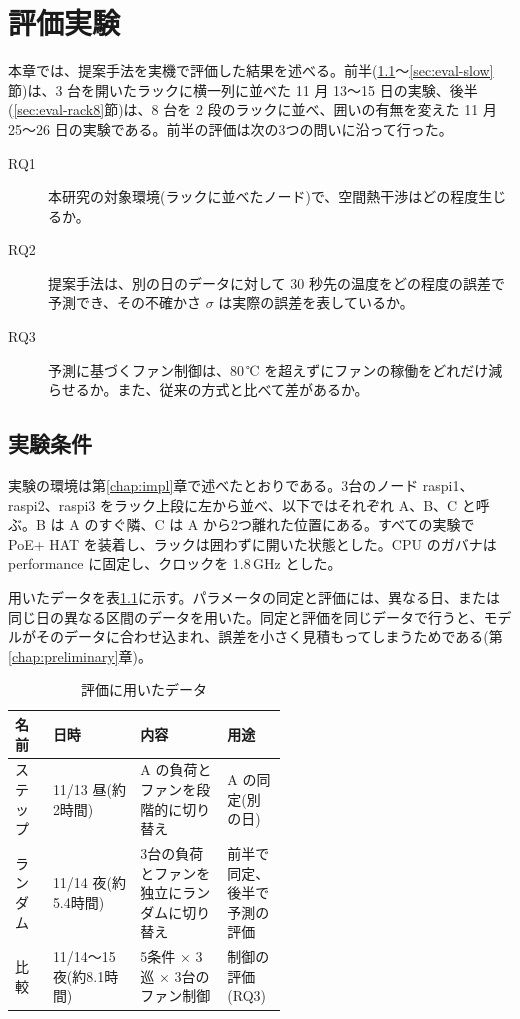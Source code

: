 \chapter{評価実験}\label{chap:eval}

本章では、提案手法を実機で評価した結果を述べる。前半(\ref{sec:eval-cond}〜\ref{sec:eval-slow}節)は、3 台を開いたラックに横一列に並べた 11 月 13〜15 日の実験、後半(\ref{sec:eval-rack8}節)は、8 台を 2 段のラックに並べ、囲いの有無を変えた 11 月 25〜26 日の実験である。前半の評価は次の3つの問いに沿って行った。

\begin{description}
  \item[RQ1] 本研究の対象環境(ラックに並べたノード)で、空間熱干渉はどの程度生じるか。
  \item[RQ2] 提案手法は、別の日のデータに対して 30 秒先の温度をどの程度の誤差で予測でき、その不確かさ $\sigma$ は実際の誤差を表しているか。
  \item[RQ3] 予測に基づくファン制御は、80\,℃ を超えずにファンの稼働をどれだけ減らせるか。また、従来の方式と比べて差があるか。
\end{description}

\section{実験条件}\label{sec:eval-cond}
実験の環境は第\ref{chap:impl}章で述べたとおりである。3台のノード raspi1、raspi2、raspi3 をラック上段に左から並べ、以下ではそれぞれ A、B、C と呼ぶ。B は A のすぐ隣、C は A から2つ離れた位置にある。すべての実験で PoE+ HAT を装着し、ラックは囲わずに開いた状態とした。CPU のガバナは performance に固定し、クロックを 1.8\,GHz とした。

用いたデータを表\ref{tab:eval-data}に示す。パラメータの同定と評価には、異なる日、または同じ日の異なる区間のデータを用いた。同定と評価を同じデータで行うと、モデルがそのデータに合わせ込まれ、誤差を小さく見積もってしまうためである(第\ref{chap:preliminary}章)。

\begin{table}[tb]
  \centering
  \caption{評価に用いたデータ}
  \label{tab:eval-data}
  \small
  \begin{tabular}{llp{0.32\linewidth}p{0.22\linewidth}}
    \toprule
    名前 & 日時 & 内容 & 用途 \\
    \midrule
    ステップ & 11/13 昼(約2時間) & A の負荷とファンを段階的に切り替え & A の同定(別の日) \\
    ランダム & 11/14 夜(約5.4時間) & 3台の負荷とファンを独立にランダムに切り替え & 前半で同定、後半で予測の評価 \\
    比較 & 11/14〜15 夜(約8.1時間) & 5条件 × 3巡 × 3台のファン制御 & 制御の評価(RQ3) \\
    \bottomrule
  \end{tabular}
\end{table}

